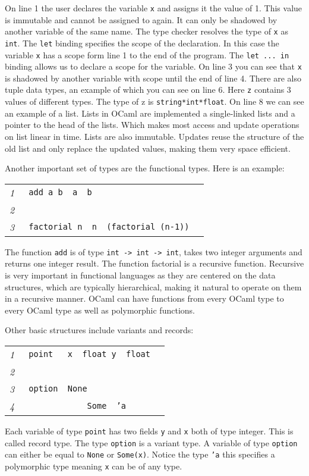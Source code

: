 \documentclass[12pt,twoside,notitlepage]{report}
\newcommand{\mlkeywordA}[1]{\mbox{\color{cyan}{\textbf{\texttt{#1}}}}}
\newcommand{\mlkeyword}[1]{\mbox{\color{red}{#1}}}
\newcommand{\mloperator}[1]{\mbox{\color{darkgreen}{#1}}}
\newcommand{\mlcodeline}[2]{\tiny\sl #1 & \begin{minipage}[c]{0.8\linewidth}\begin{alltt}\mbox{#2}\end{alltt}\end{minipage}\\}
\begin{document}
On line 1 the user declares the variable {\tt x} and assigns it the value of 1.  This value is immutable and cannot be assigned to again.  It can only be shadowed by another variable of the same name. The type checker resolves the type of {\tt x} as {\tt int}. The {\tt let} binding specifies the scope of the declaration. In this case the variable {\tt x} has a scope form line 1 to the end of the program. The {\tt let ... in} binding allows us to declare a scope for the variable. On line 3 you can see that {\tt x} is shadowed by another variable with scope until the end of line 4. There are also tuple data types, an example of which you can see on line 6. Here {\tt z} contains 3 values of different types. The type of z is {\tt string*int*float}. On line 8 we can see an example of a list. Lists in OCaml are implemented a single-linked lists and a pointer to the head of the lists. Which makes most access and update operations on list linear in time. Lists are also immutable. Updates reuse the structure of the old list and only replace the updated values, making them very space efficient.

Another important set of types are the functional types. Here is an example:



{\scriptsize\noindent\begin{longtable}{r|l}
\mlcodeline{1}{\mlkeywordA{let}~add~a~b~\mlkeyword{=}~a~\mloperator{+}~b
}
\mlcodeline{2}{
}
\mlcodeline{3}{\mlkeywordA{let~rec}~factorial~n~\mlkeyword{=}~n~\mloperator{*}~(factorial~(n-1))~~}
\end{longtable}
} 

The function {\tt add} is of type {\tt int -> int -> int}, takes two integer arguments and returns one integer result. The function factorial is a recursive function. Recursive is very important in functional languages as they are centered on the data structures, which are typically hierarchical, making it natural to operate on them in a recursive manner. OCaml can have functions from every OCaml type to every OCaml type as well as polymorphic functions.

Other basic structures include variants and records:



{\scriptsize\noindent\begin{longtable}{r|l}
\mlcodeline{1}{\mlkeyword{type}~point~\mlkeyword{=}~\mloperator{\{}~x~\mloperator{\mbox{\COLON}}~float\mloperator{\mbox{\SC}}~y~\mloperator{\mbox{\COLON}}~float~\mloperator{\}}
}
\mlcodeline{2}{
}
\mlcodeline{3}{\mlkeyword{type}~option~\mlkeyword{=}~None
}
\mlcodeline{4}{~~~~~~~~~~~~~\mloperator{|}Some~\mlkeyword{of}~'a
}
\end{longtable}
}
Each variable of type {\tt point} has two fields {\tt y} and {\tt x} both of type integer. This is called record type. The type {\tt option} is a variant type. A variable of type {\tt option} can either be equal to {\tt None} or {\tt Some(x)}. Notice the type {\tt 'a} this specifies a polymorphic type meaning {\tt x} can be of any type.
\end{document}
